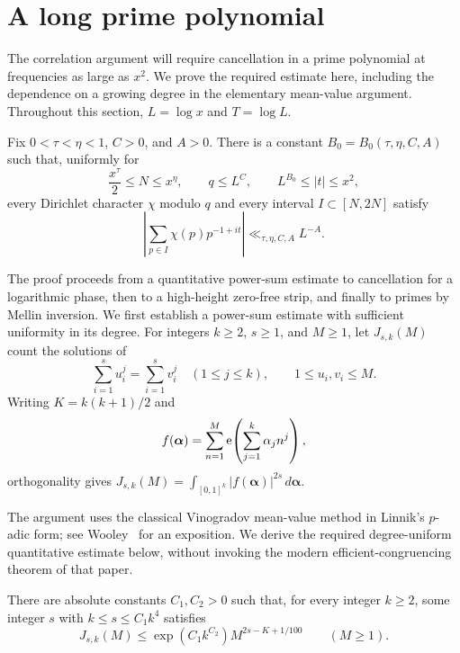 \section{A long prime polynomial}\label{lp:section}

The correlation argument will require cancellation in a prime polynomial at
frequencies as large as $x^2$.  We prove the required estimate here, including
the dependence on a growing degree in the elementary mean-value argument.
Throughout this section, $L=\log x$ and $T=\log L$.

\begin{lemma}\label{lp:prime-polynomial}
Fix $0<\tau<\eta<1$, $C>0$, and $A>0$.  There is a constant
$B_0=B_0(\tau,\eta,C,A)$ such that, uniformly for
\[
 \frac{x^\tau}{2}\le N\le x^\eta,\qquad
 q\le L^C,\qquad L^{B_0}\le |t|\le x^2,
\]
every Dirichlet character $\chi$ modulo $q$ and every interval
$I\subset[N,2N]$ satisfy
\begin{equation}\label{lp:prime-estimate}
 \left|\sum_{p\in I}\chi(p)p^{-1+it}\right|
 \ll_{\tau,\eta,C,A} L^{-A}.
\end{equation}
\end{lemma}

The proof proceeds from a quantitative power-sum estimate to cancellation
for a logarithmic phase, then to a high-height zero-free strip, and finally
to primes by Mellin inversion.
We first establish a power-sum estimate with sufficient uniformity in its
degree.  For integers $k\ge2$, $s\ge1$, and $M\ge1$, let $J_{s,k}(M)$ count
the solutions of
\[
 \sum_{i=1}^s u_i^j=\sum_{i=1}^s v_i^j
 \quad(1\le j\le k),\qquad 1\le u_i,v_i\le M.
\]
Writing $K=k(k+1)/2$ and
\[
 f(\boldsymbol\alpha)=\sum_{n=1}^M
       \mathrm{e}\!\left(\sum_{j=1}^k\alpha_j n^j\right),
\]
orthogonality gives
$J_{s,k}(M)=\int_{[0,1]^k}|f(\boldsymbol\alpha)|^{2s}
\,d\boldsymbol\alpha$.

The argument uses the classical Vinogradov mean-value method in
Linnik's $p$-adic form; see Wooley~\cite[Section~2, pp.~1583--1585]{Wooley2012}
for an exposition.  We derive the required degree-uniform quantitative
estimate below, without invoking the modern efficient-congruencing
theorem of that paper.

\begin{lemma}\label{lp:mean-value}
There are absolute constants $C_1,C_2>0$ such that, for every integer
$k\ge2$, some integer $s$ with $k\le s\le C_1k^4$ satisfies
\begin{equation}\label{lp:mean-value-bound}
 J_{s,k}(M)\le \exp(C_1k^{C_2})M^{2s-K+1/100}
 \qquad(M\ge1).
\end{equation}
\end{lemma}

